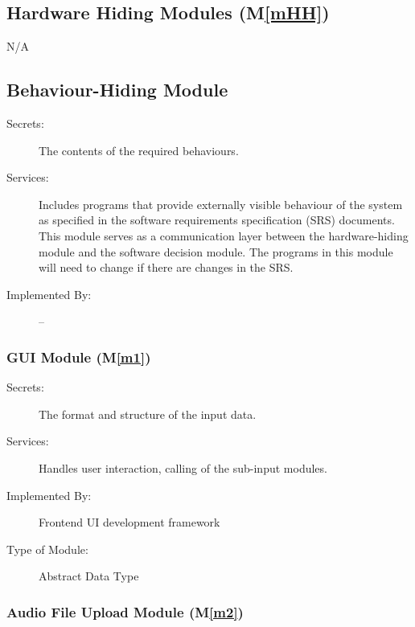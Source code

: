 \documentclass[12pt, titlepage]{article}
\newcommand{\mref}[1]{M\ref{#1}}
\begin{document}
\subsection{Hardware Hiding Modules (\mref{mHH})}

\begin{description}
\item[N/A]
\end{description}

\subsection{Behaviour-Hiding Module}

\begin{description}
\item[Secrets:]The contents of the required behaviours.
\item[Services:]Includes programs that provide externally visible behaviour of
  the system as specified in the software requirements specification (SRS)
  documents. This module serves as a communication layer between the
  hardware-hiding module and the software decision module. The programs in this
  module will need to change if there are changes in the SRS.
\item[Implemented By:] --
\end{description}

\subsubsection{GUI Module (\mref{m1})}

\begin{description}
\item[Secrets:] The format and structure of the input data.
\item[Services:] Handles user interaction, calling of the sub-input modules. 
\item[Implemented By:] Frontend UI development framework
\item[Type of Module:] Abstract Data Type
\end{description}

\subsubsection{Audio File Upload Module (\mref{m2})}
\end{document}
